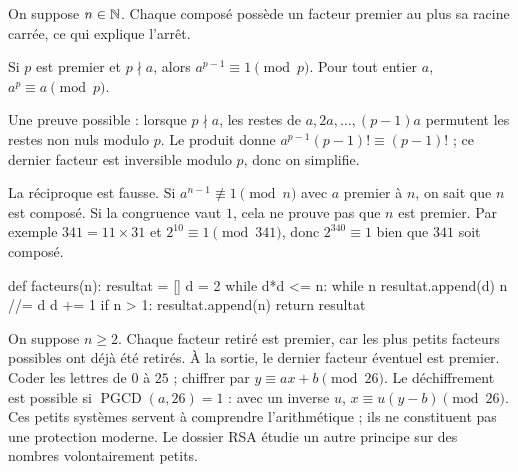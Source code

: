 On suppose $n\in\mathbb{N}$. Chaque composé possède un facteur premier au plus sa racine carrée, ce qui explique l'arrêt.
\begin{theoreme}
Si $p$ est premier et $p\nmid a$, alors $a^{p-1}\equiv1\pmod p$.
Pour tout entier $a$, $a^p\equiv a\pmod p$.
\end{theoreme}
Une preuve possible : lorsque $p\nmid a$, les restes de $a,2a,\ldots,(p-1)a$ permutent les restes non nuls modulo $p$.
Le produit donne $a^{p-1}(p-1)!\equiv(p-1)!$ ; ce dernier facteur est inversible modulo $p$, donc on simplifie.
\begin{attention}
La réciproque est fausse. Si $a^{n-1}\not\equiv1\pmod n$ avec $a$ premier à $n$, on sait que $n$ est composé. Si la congruence vaut $1$, cela ne prouve pas que $n$ est premier.
Par exemple $341=11\times31$ et $2^{10}\equiv1\pmod{341}$, donc $2^{340}\equiv1$ bien que $341$ soit composé.
\end{attention}
\begin{python}
def facteurs(n):
    resultat = []
    d = 2
    while d*d <= n:
        while n %
            resultat.append(d)
            n //= d
        d += 1
    if n > 1: resultat.append(n)
    return resultat
\end{python}
On suppose $n\geq2$. Chaque facteur retiré est premier, car les plus petits facteurs possibles ont déjà été retirés. À la sortie, le dernier facteur éventuel est premier.
Coder les lettres de $0$ à $25$ ; chiffrer par $y\equiv ax+b\pmod{26}$.
Le déchiffrement est possible si $\operatorname{PGCD}(a,26)=1$ : avec un inverse $u$, $x\equiv u(y-b)\pmod{26}$.
Ces petits systèmes servent à comprendre l'arithmétique ; ils ne constituent pas une protection moderne. Le dossier RSA étudie un autre principe sur des nombres volontairement petits.

